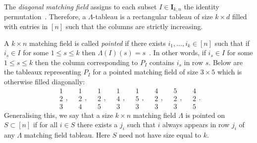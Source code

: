 \documentclass[ALCO,ThmDefs,Unicode,epreuves]{cedram}
\begin{document}
\begin{exam}\label{ex:diagonal1}
The \emph{diagonal matching field} assigns to
each subset $I \in \mathbf{I}_{k,n}$ the identity permutation~\cite[Example~1.3]{sturmfels1993maximal}.
Therefore, a $\Lambda$-tableau is a rectangular tableau of size $k \times d$ filled with entries in $[n]$ such that the columns are strictly increasing. 
\end{exam}

\begin{exam}\label{ex:pointed1}
A $k \times n$ matching field is called \emph{pointed} if there exists $i_1, \ldots, i_k \in [n]$ such that if $i_s \in I$ for some 
$1 \leq s \leq k$ then $\Lambda(I)(s) = s$~\cite[Example~1.4]{sturmfels1993maximal}. In other words, if $i_s \in I$ for some $1\leq s \leq k$ then the column corresponding to $P_I$ contains $i_s$ in row $s$. Below are the tableaux representing $P_I$ for a pointed matching field of size $3 \times 5$ which is otherwise filled diagonally:
\[
\begin{array}{c}1 \\2 \\ 3 \end{array} , \quad
\begin{array}{c} 1 \\2 \\4 \end{array},\quad
\begin{array}{c}1 \\2 \\ 5 \end{array} , \quad
\begin{array}{c}1 \\ 4 \\ 3 \end{array} ,\quad
\begin{array}{c}1 \\5 \\ 3\end{array} ,\quad
\begin{array}{c}4 \\ 2\\ 3 \end{array} ,\quad
\begin{array}{c}5 \\2 \\ 3\end{array} ,\quad
\begin{array}{c} 4 \\ 2 \\ 5 \end{array}. 
\]
Generalising this, we say that a size $k \times n$ matching field $\Lambda$ is pointed on $S \subset [n]$ if for all $i \in S$ there exists a $j_i$ such that $i$ always appears in row $j_i$ of any $\Lambda$ matching field tableau. 
Here $S$ need not have size equal to $k$. 
\end{exam}
\end{document}
